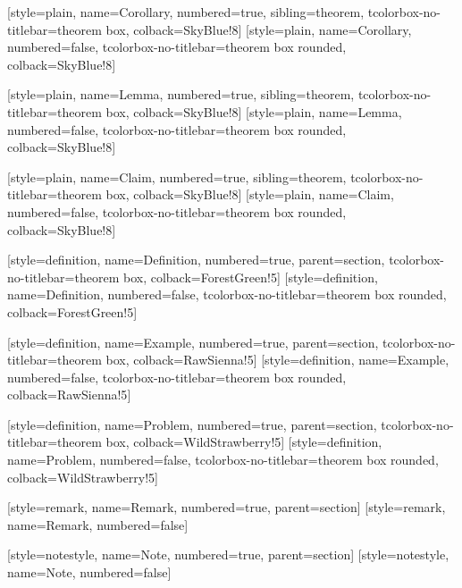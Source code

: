 [style=plain, name=Corollary, numbered=true, sibling=theorem,
    tcolorbox-no-titlebar={theorem box, colback=SkyBlue!8}]
[style=plain, name=Corollary, numbered=false,
    tcolorbox-no-titlebar={theorem box rounded, colback=SkyBlue!8}]

[style=plain, name=Lemma, numbered=true, sibling=theorem,
    tcolorbox-no-titlebar={theorem box, colback=SkyBlue!8}]
[style=plain, name=Lemma, numbered=false,
    tcolorbox-no-titlebar={theorem box rounded, colback=SkyBlue!8}]

[style=plain, name=Claim, numbered=true, sibling=theorem,
    tcolorbox-no-titlebar={theorem box, colback=SkyBlue!8}]
[style=plain, name=Claim, numbered=false,
    tcolorbox-no-titlebar={theorem box rounded, colback=SkyBlue!8}]

[style=definition, name=Definition, numbered=true, parent=section,
    tcolorbox-no-titlebar={theorem box, colback=ForestGreen!5}]
[style=definition, name=Definition, numbered=false,
    tcolorbox-no-titlebar={theorem box rounded, colback=ForestGreen!5}]

[style=definition, name=Example, numbered=true, parent=section,
    tcolorbox-no-titlebar={theorem box, colback=RawSienna!5}]
[style=definition, name=Example, numbered=false,
    tcolorbox-no-titlebar={theorem box rounded, colback=RawSienna!5}]

[style=definition, name=Problem, numbered=true, parent=section,
    tcolorbox-no-titlebar={theorem box, colback=WildStrawberry!5}]
[style=definition, name=Problem, numbered=false,
    tcolorbox-no-titlebar={theorem box rounded, colback=WildStrawberry!5}]

[style=remark, name=Remark, numbered=true, parent=section]
[style=remark, name=Remark, numbered=false]

\newcommand{\notehandmark}{\llap{\raisebox{0.05ex}{\large\ding{45}}\hspace{0.6em}}}

[style=notestyle, name={\notehandmark Note}, numbered=true, parent=section]
[style=notestyle, name={\notehandmark Note}, numbered=false]

